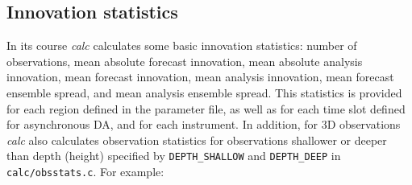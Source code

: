 \documentclass[11pt]{report}
\begin{document}
\subsection{Innovation statistics}

In its course \emph{calc} calculates some basic innovation statistics: number of observations, mean absolute forecast innovation, mean absolute analysis innovation, mean forecast innovation, mean analysis innovation, mean forecast ensemble spread, and mean analysis ensemble spread.
This statistics is provided for each region defined in the parameter file, as well as for each time slot defined for asynchronous DA, and for each instrument.
In addition, for 3D observations \emph{calc} also calculates observation statistics for observations shallower or deeper than depth (height) specified by \verb|DEPTH_SHALLOW| and \verb|DEPTH_DEEP| in \verb|calc/obsstats.c|.
For example:
\end{document}
